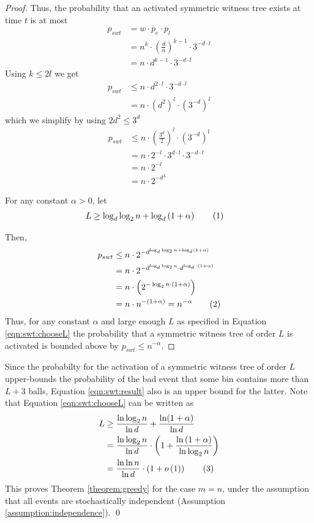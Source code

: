 \documentclass[a4paper,12pt]{article}
\newcommand\numberthis{\addtocounter{equation}{1}\tag{\theequation}}
\newcommand\neqn[1]{\numberthis\label{eqn:#1}}
\begin{document}
\begin{proof}
Thus, the probability that an activated symmetric witness tree exists at time $t$ is at most 
\begin{align*}
p_{swt} &= w \cdot p_e \cdot p_l \\
		&= n^{k} \cdot \left(\frac{d}{n}\right)^{k-1} \cdot 3^{-d \cdot l} \\
		&= n \cdot d^{k-1} \cdot 3^{-d \cdot l}
\end{align*}
Using $k \leq 2l$ we get
\begin{align*}
p_{swt} &\leq n \cdot d^{2\cdot l} \cdot 3^{-d \cdot l} \\
		&= n \cdot \left(d^2\right)^l \cdot \left( 3^{-d} \right)^l
\end{align*}
which we simplify by using $2d^2 \leq 3^d$
\begin{align*}
p_{swt} &\leq n \cdot \left(\frac{3^d}{2}\right)^l \cdot \left( 3^{-d}\right)^l \\
		&= n \cdot 2^{-l} \cdot 3^{d\cdot l} \cdot 3^{-d \cdot l} \\
		&= n\cdot 2^{-l}		\\
		&= n\cdot 2^{-d^L}		
\end{align*}

For any constant $\alpha > 0 $, let
\begin{align*}
L &\geq \log_d\log_2 n + \log_d\left(1+\alpha\right) \neqn{swt:chooseL}
\end{align*}

Then, 
\begin{align*}
p_{swt} &\leq n \cdot 2^{{-d}^{\log_d\log_2 n + \log_d\left(1+\alpha\right)}} \\
		&= n \cdot 2^{-{d}^{\log_d\log_2 n}\cdot d^{\log_d \cdot\left(1+\alpha\right)}} \\
		&= n \cdot \left( 2^{-\log_2 n \cdot \left(1+ \alpha \right)} \right) \\
		&= n \cdot n^{-\left(1+\alpha\right)} = n^{-\alpha} \neqn{swt:result}
\end{align*}
Thus, for any constant $\alpha$ and large enough $L$ as specified in Equation \ref{eqn:swt:chooseL} the probability that a symmetric witness tree of order $L$ is activated is bounded above by $p_{swt }\leq n^{-\alpha}$.
\end{proof}

Since the probabilty for the activation of a symmetric witness tree of order $L$ upper-bounds the probability of the bad event that some bin contains more than $L+3$ balls, Equation \ref{eqn:swt:result} also is an upper bound for the latter. Note that Equation \ref{eqn:swt:chooseL} can be written as
\begin{align*}
L &\geq  \frac{\ln\log_2 n}{\ln d} + \frac{\ln(1+\alpha)}{\ln d} \\
   &= \frac{\ln \log_2 n}{\ln d} \cdot \left(1 + \frac{\ln\left(1+\alpha\right)}{\ln \log_2 n}\right) \\
  &=  \frac{\ln \ln n}{\ln d} \cdot \left( 1+ o\left( 1\right)\right) \neqn{swt:boundL}
\end{align*}
This proves Theorem \ref{theorem:greedy} for the case $m=n$, under the assumption that all events are stochastically independent (Assumption \ref{assumption:independence}). \qed
\end{document}
